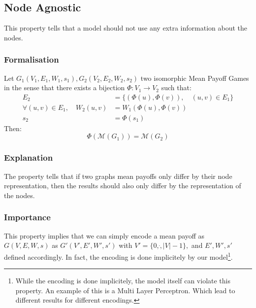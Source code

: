 \subsection{Node Agnostic}
This property tells that a model should not use any extra information about the nodes.
\subsubsection{Formalisation}
Let $G_1(V_1,E_1,W_1,s_1),G_2(V_2,E_2,W_2,s_2)$ two isomorphic Mean Payoff Games in the sense that there exists a bijection $\Phi:V_1\rightarrow V_2$ such that:
\begin{align*}
	E_2&=\{(\Phi(u),\Phi(v)),\quad (u,v)\in E_1\}\\
	\forall (u,v)\in E_1,\quad W_2(u,v)&=W_1(\Phi(u),\Phi(v)) \\
	s_2&= \Phi(s_1)
\end{align*}
Then:
$$
\Phi\left(\mathcal{M}(G_1)\right) = \mathcal{M}(G_2)
$$
\subsubsection{Explanation}
The property tells that if two graphs mean payoffs only differ by their node representation, then the results should also only differ by the representation of the nodes.

\subsubsection{Importance}
This property implies that we can simply encode a mean payoff as $G(V,E,W,s)$ as $G'(V',E',W',s')$ with  $V'=\{0,\dot,\lvert V \rvert-1\},$ and $E',W',s'$ defined accordingly.
\newline In fact, the encoding is done implicitely by our model\footnote{While the encoding is done implicitely, the model itself can violate this property. An example of this is a Multi Layer Perceptron. Which lead to different results for different encodings.}.

